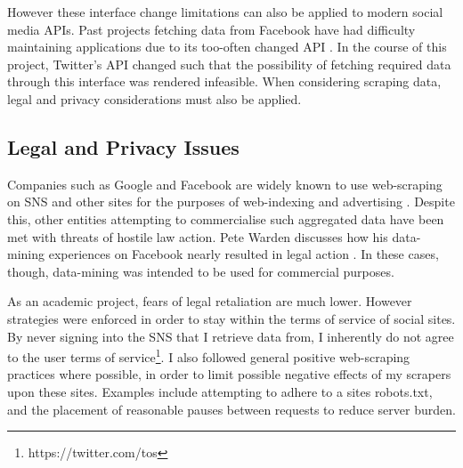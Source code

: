 However these interface change limitations can also be applied to modern social media APIs. Past projects fetching data from Facebook have had difficulty maintaining applications due to its too-often changed API \cite{kosinski2013private}. In the course of this project, Twitter's API changed such that the possibility of fetching required data through this interface was rendered infeasible. When considering scraping data, legal and privacy considerations must also be applied.





\subsection{Legal and Privacy Issues}

Companies such as Google and Facebook are widely known to use web-scraping on SNS and other sites for the purposes of web-indexing and advertising \cite{no_api_for_me}. Despite this, other entities attempting to commercialise such aggregated data have been met with threats of hostile law action. Pete Warden discusses how his data-mining experiences on Facebook nearly resulted in legal action \cite{facebook_sued}. In these cases, though, data-mining was intended to be used for commercial purposes. 

As an academic project, fears of legal retaliation are much lower. However strategies were enforced in order to stay within the terms of service of social sites. By never signing into the SNS that I retrieve data from, I inherently do not agree to the user terms of service\footnote{https://twitter.com/tos}. I also followed general positive web-scraping practices where possible, in order to limit possible negative effects of my scrapers upon these sites. Examples include attempting to adhere to a sites robots.txt, and the placement of reasonable pauses between requests to reduce server burden. 


